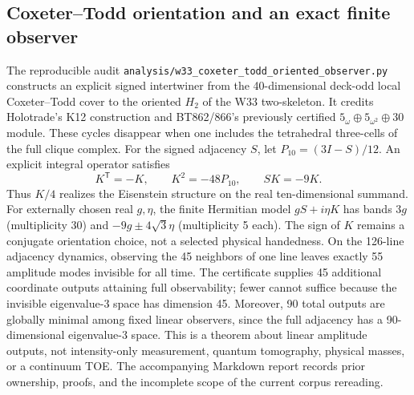 \subsection{Coxeter--Todd orientation and an exact finite observer}
\label{sec:k12-oriented-observer}
The reproducible audit \texttt{analysis/w33\_coxeter\_todd\_oriented\_observer.py}
constructs an explicit signed intertwiner from the 40-dimensional deck-odd
local Coxeter--Todd cover to the oriented $H_2$ of the W33 two-skeleton.
It credits Holotrade's K12 construction and BT862/866's previously certified
$5_\omega\oplus5_{\omega^2}\oplus30$ module. These cycles disappear when
one includes the tetrahedral three-cells of the full clique complex.
For the signed adjacency $S$, let $P_{10}=(3I-S)/12$. An explicit integral
operator satisfies
\[
 K^{\mathsf T}=-K,\qquad K^2=-48P_{10},\qquad SK=-9K.
\]
Thus $K/4$ realizes the Eisenstein structure on the real ten-dimensional
summand. For externally chosen real $g,\eta$, the finite Hermitian model
$gS+i\eta K$ has bands $3g$ (multiplicity 30) and
$-9g\pm4\sqrt3\eta$ (multiplicity 5 each). The sign of $K$ remains a
conjugate orientation choice, not a selected physical handedness.
On the 126-line adjacency dynamics, observing the 45 neighbors of one line
leaves exactly 55 amplitude modes invisible for all time. The certificate
supplies 45 additional coordinate outputs attaining full observability;
fewer cannot suffice because the invisible eigenvalue-3 space has dimension
45. Moreover, 90 total outputs are globally minimal among fixed linear
observers, since the full adjacency has a 90-dimensional eigenvalue-3 space.
This is a theorem about linear amplitude outputs, not intensity-only
measurement, quantum tomography, physical masses, or a continuum TOE.
The accompanying Markdown report records prior ownership, proofs, and the
incomplete scope of the current corpus rereading.
